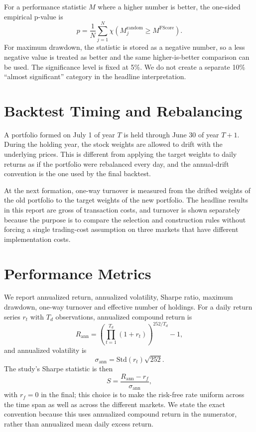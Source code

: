 \documentclass[11pt,a4paper]{report}
\numberwithin{figure}{chapter}
\numberwithin{table}{chapter}
\numberwithin{equation}{chapter}
\begin{document}
For a performance statistic $M$ where a higher number is better, the one-sided empirical p-value is
\begin{equation}
p = \frac{1}{N}\sum_{j=1}^{N}\chi\left(M_j^{\mathrm{random}} \geq M^{\mathrm{FScore}}\right).
\label{eq:mc_pvalue}
\end{equation}
For maximum drawdown, the statistic is stored as a negative number, so a less negative value is treated as better and the same higher-is-better comparison can be used. The significance level is fixed at 5\%. We do not create a separate 10\% ``almost significant'' category in the headline interpretation.

\section{Backtest Timing and Rebalancing}

A portfolio formed on July 1 of year $T$ is held through June 30 of year $T+1$. During the holding year, the stock weights are allowed to drift with the underlying prices. This is different from applying the target weights to daily returns as if the portfolio were rebalanced every day, and the annual-drift convention is the one used by the final backtest.

At the next formation, one-way turnover is measured from the drifted weights of the old portfolio to the target weights of the new portfolio. The headline results in this report are gross of transaction costs, and turnover is shown separately because the purpose is to compare the selection and construction rules without forcing a single trading-cost assumption on three markets that have different implementation costs.

\section{Performance Metrics}
\label{sec:metrics}

We report annualized return, annualized volatility, Sharpe ratio, maximum drawdown, one-way turnover and effective number of holdings. For a daily return series $r_t$ with $T_d$ observations, annualized compound return is
\begin{equation}
R_{\mathrm{ann}} = \left(\prod_{t=1}^{T_d}(1+r_t)\right)^{252/T_d}-1,
\end{equation}
and annualized volatility is
\begin{equation}
\sigma_{\mathrm{ann}} = \mathrm{Std}(r_t)\sqrt{252}.
\end{equation}
The study's Sharpe statistic is then
\begin{equation}
S = \frac{R_{\mathrm{ann}}-r_f}{\sigma_{\mathrm{ann}}},
\label{eq:sharpe}
\end{equation}
with $r_f=0$ in the final; this choice is to make the risk-free rate uniform across the time span as well as across the different markets. We state the exact convention because this uses annualized compound return in the numerator, rather than annualized mean daily excess return.
\end{document}
